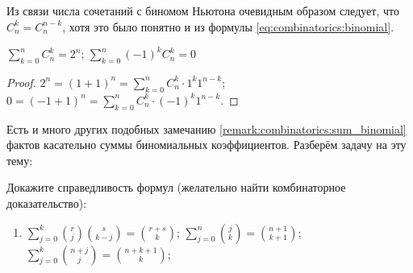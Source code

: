 Из связи числа сочетаний с биномом Ньютона очевидным образом следует, что $ C_n^k = C_n^{n-k} $,
хотя это было понятно и из формулы \eqref{eq:combinatorics:binomial}.

\begin{remark}
    \label{remark:combinatorics:sum_binomial}
    $ \displaystyle \sum_{k=0}^n C_n^k = 2^n $; \>
    $ \displaystyle \sum_{k=0}^n (-1)^k C_n^k = 0 $
\end{remark}

\begin{proof}
    $ \displaystyle 2^n = (1 + 1)^n = \sum_{k=0}^n C_n^k \cdot 1^k 1^{n-k} $; \>
    $ \displaystyle 0   = (-1 + 1)^n = \sum_{k=0}^n C_n^k \cdot (-1)^k 1^{n-k} $.
\end{proof}

Есть и много других подобных замечанию \ref{remark:combinatorics:sum_binomial} фактов касательно суммы биномиальных коэффициентов.
Разберём задачу на эту тему:

\begin{Exercise}[counter=SecExercise]
    \noindent
    Докажите справедливость формул (желательно найти комбинаторное доказательство):
    \begin{enumerate}[leftmargin=*]
        \item $ \displaystyle \sum_{j=0}^k \binom{r}{j} \binom{s}{k-j} = \binom{r + s}{k} $;
        \inlineitem $ \displaystyle \sum_{j=0}^n \binom{j}{k} = \binom{n+1}{k+1} $;
        \inlineitem $ \displaystyle \sum_{j=0}^k \binom{n + j}{j} = \binom{n + k + 1}{k} $;
    \end{enumerate}
\end{Exercise}

